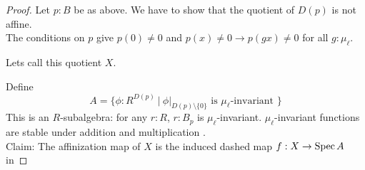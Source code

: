 \begin{proof}
	Let $p : B$ be as above. We have to show that the quotient of $D(p)$ is not affine. \\
	The conditions on $p$ give $p(0) \neq 0$ and $p(x) \neq 0 \to p(gx) \neq 0$ for all $g : \mu_\ell$.
	
	Lets call this quotient $X$.
	
	Define 
	\[
	A = \{\phi : R^{D(p)} \ | \ \phi|_{D(p) \setminus \{0\}} \text{  is $\mu_{\ell}$-invariant }\}
	\]
	This is an $R$-subalgebra: for any $r : R$, $r : B_p$ is $\mu_{\ell}$-invariant. $\mu_{\ell}$-invariant functions are stable under addition and multiplication . \\
	
	Claim: The affinization map of $X$ is the induced dashed map $f : X \to \operatorname{Spec} A$ in
	

\end{proof}
